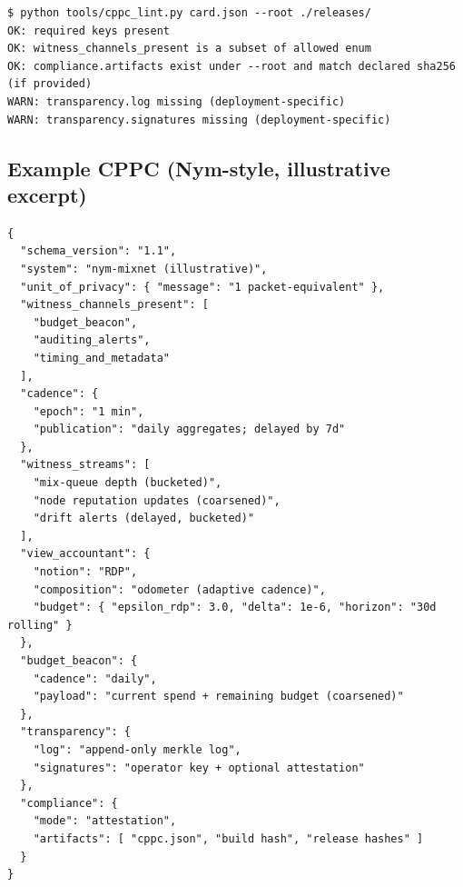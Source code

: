 \documentclass[11pt]{article}
\theoremstyle{definition}
\theoremstyle{remark}
\begin{document}
\begin{lstlisting}
$ python tools/cppc_lint.py card.json --root ./releases/
OK: required keys present
OK: witness_channels_present is a subset of allowed enum
OK: compliance.artifacts exist under --root and match declared sha256 (if provided)
WARN: transparency.log missing (deployment-specific)
WARN: transparency.signatures missing (deployment-specific)
\end{lstlisting}



\subsection{Example CPPC (Nym-style, illustrative excerpt)}
\begin{lstlisting}
{
  "schema_version": "1.1",
  "system": "nym-mixnet (illustrative)",
  "unit_of_privacy": { "message": "1 packet-equivalent" },
  "witness_channels_present": [
    "budget_beacon",
    "auditing_alerts",
    "timing_and_metadata"
  ],
  "cadence": {
    "epoch": "1 min",
    "publication": "daily aggregates; delayed by 7d"
  },
  "witness_streams": [
    "mix-queue depth (bucketed)",
    "node reputation updates (coarsened)",
    "drift alerts (delayed, bucketed)"
  ],
  "view_accountant": {
    "notion": "RDP",
    "composition": "odometer (adaptive cadence)",
    "budget": { "epsilon_rdp": 3.0, "delta": 1e-6, "horizon": "30d rolling" }
  },
  "budget_beacon": {
    "cadence": "daily",
    "payload": "current spend + remaining budget (coarsened)"
  },
  "transparency": {
    "log": "append-only merkle log",
    "signatures": "operator key + optional attestation"
  },
  "compliance": {
    "mode": "attestation",
    "artifacts": [ "cppc.json", "build hash", "release hashes" ]
  }
}
\end{lstlisting}
\end{document}

